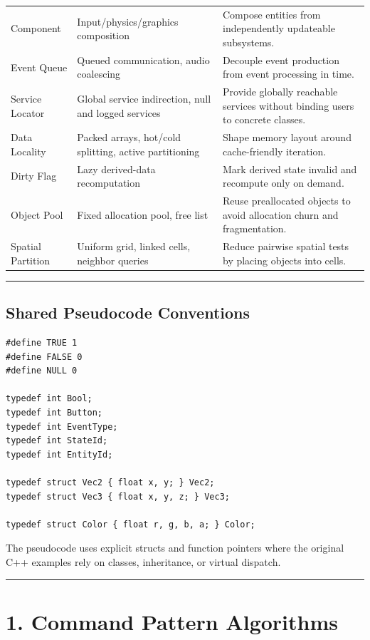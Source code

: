 \documentclass[10pt,letterpaper]{article}
\begin{document}
\begin{longtable}{L{0.20\textwidth}L{0.34\textwidth}L{0.36\textwidth}}
Component & Input/physics/graphics composition & Compose entities from independently updateable subsystems. \\
Event Queue & Queued communication, audio coalescing & Decouple event production from event processing in time. \\
Service Locator & Global service indirection, null and logged services & Provide globally reachable services without binding users to concrete classes. \\
Data Locality & Packed arrays, hot/cold splitting, active partitioning & Shape memory layout around cache-friendly iteration. \\
Dirty Flag & Lazy derived-data recomputation & Mark derived state invalid and recompute only on demand. \\
Object Pool & Fixed allocation pool, free list & Reuse preallocated objects to avoid allocation churn and fragmentation. \\
Spatial Partition & Uniform grid, linked cells, neighbor queries & Reduce pairwise spatial tests by placing objects into cells. \\
\bottomrule
\end{longtable}

\medskip\hrule\medskip

\subsection{Shared Pseudocode Conventions}

\begin{verbatim}
#define TRUE 1
#define FALSE 0
#define NULL 0

typedef int Bool;
typedef int Button;
typedef int EventType;
typedef int StateId;
typedef int EntityId;

typedef struct Vec2 { float x, y; } Vec2;
typedef struct Vec3 { float x, y, z; } Vec3;

typedef struct Color { float r, g, b, a; } Color;
\end{verbatim}

The pseudocode uses explicit structs and function pointers where the original C++ examples rely on classes, inheritance, or virtual dispatch.

\medskip\hrule\medskip

\clearpage
\section{1. Command Pattern Algorithms}
\end{document}
